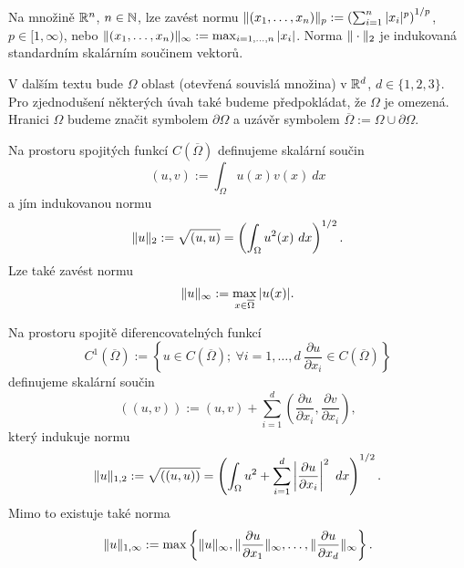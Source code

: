 \begin{ex}
Na množině $\mathbb R^n$, $n\in\mathbb N$, lze zavést normu $\|(x_1,\ldots,x_n)\|_p:=\left(\sum_{i=1}^n|x_i|^p\right)^{1/p}$, $p\in[1,\infty)$, nebo $\|(x_1,\ldots,x_n)\|_\infty:=\max_{i=1,\ldots,n}|x_i|$. Norma $\|\cdot\|_2$ je indukovaná standardním skalárním součinem vektorů.
\end{ex}

V dalším textu bude $\Omega$ oblast (otevřená souvislá množina) v $\mathbb R^d$, $d\in\{1,2,3\}$.
Pro zjednodušení některých úvah také budeme předpokládat, že $\Omega$ je omezená.
Hranici $\Omega$ budeme značit symbolem $\partial\Omega$ a uzávěr symbolem $\overline\Omega:=\Omega\cup\partial\Omega$.

\begin{ex}
Na prostoru spojitých funkcí $C(\overline\Omega)$ definujeme skalární součin
\[ (u,v):=\int_\Omega u(x) v(x)~dx \]
a jím indukovanou normu
\[ \|u\|_2 := \sqrt{(u,u)} = \left(\int_\Omega u^2(x)~dx\right)^{1/2}. \]
Lze také zavést normu
\[ \|u\|_\infty := \max_{x\in\overline\Omega}|u(x)|. \]
\end{ex}

\begin{ex}
Na prostoru spojitě diferencovatelných funkcí
\[ C^1(\overline\Omega):=\left\{u\in C(\overline\Omega);~\forall i=1,\ldots,d~\frac{\partial u}{\partial x_i}\in C(\overline\Omega)\right\} \]
definujeme skalární součin
\[ ((u,v)) := (u,v) + \sum_{i=1}^d(\frac{\partial u}{\partial x_i},\frac{\partial v}{\partial x_i}), \]
který indukuje normu
\[ \|u\|_{1,2} := \sqrt{((u,u))} = \left(\int_\Omega u^2 + \sum_{i=1}^d\left|\frac{\partial u}{\partial x_i}\right|^2~dx\right)^{1/2}. \]
Mimo to existuje také norma
\[ \|u\|_{1,\infty} := \max\left\{\|u\|_{\infty},\|\frac{\partial u}{\partial x_1}\|_{\infty},\dots,\|\frac{\partial u}{\partial x_d}\|_\infty\right\}. \]
\end{ex}





